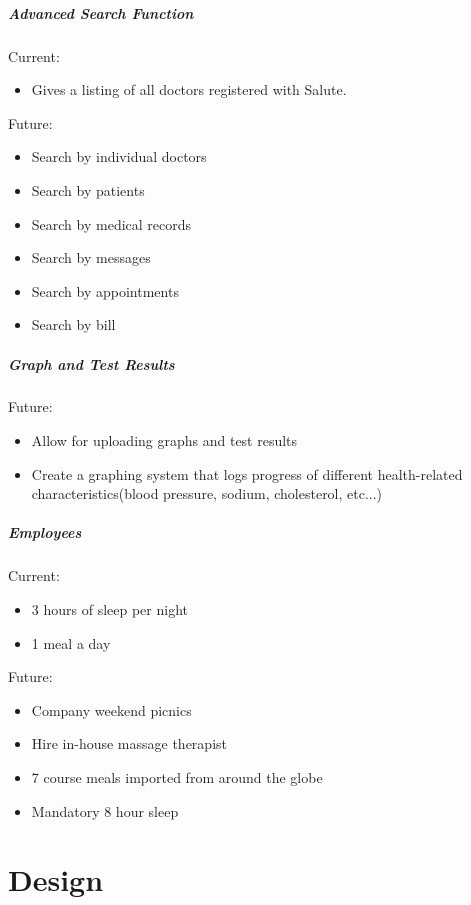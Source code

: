\documentclass[12pt]{report}
\begin{document}
\subsubsection{Advanced Search Function}
Current:
\begin{itemize}
\item Gives a listing of all doctors registered with Salute.
\end{itemize}
Future: 
\begin{itemize}
\item Search by individual doctors 
\item Search by patients
\item Search by medical records 
\item Search by messages
\item Search by appointments
\item Search by bill
\end{itemize}

\subsubsection{Graph and Test Results}
Future: 
\begin{itemize}
\item Allow for uploading graphs and test results
\item Create a graphing system that logs progress of different health-related characteristics(blood pressure, sodium, cholesterol, etc...)
\end{itemize}

\subsubsection{Employees}
Current:
\begin{itemize}
\item 3 hours of sleep per night
\item 1 meal a day
\end{itemize}
Future:
\begin{itemize}
\item Company weekend picnics
\item Hire in-house massage therapist
\item 7 course meals imported from around the globe
\item Mandatory 8 hour sleep
\end{itemize}

\part{Design}
\end{document}
